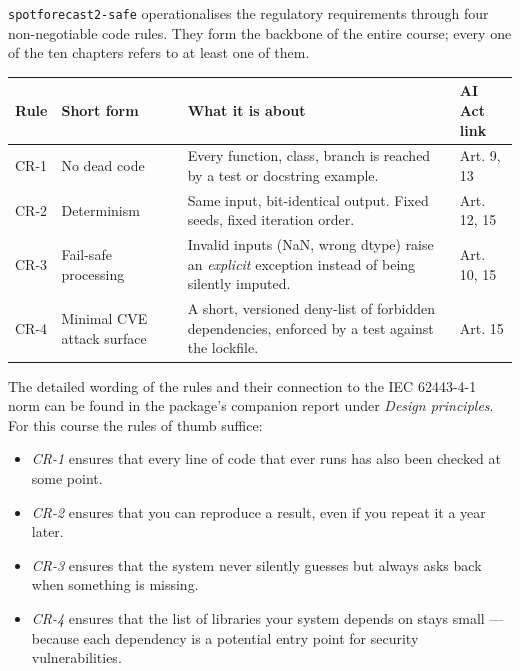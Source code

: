 \documentclass[
  english,
  letterpaper,
]{scrbook}
\newcounter{none} %
\providecommand{\tightlist}{%
  \setlength{\itemsep}{0pt}\setlength{\parskip}{0pt}}
\begin{document}

\texttt{spotforecast2-safe} operationalises the regulatory requirements
through four non-negotiable code rules. They form the backbone of the
entire course; every one of the ten chapters refers to at least one of
them.

{\def\LTcaptype{none} %
\begin{longtable}[]{@{}
  >{\centering\arraybackslash}p{}
  >{\raggedright\arraybackslash}p{}
  >{\raggedright\arraybackslash}p{}
  >{\raggedright\arraybackslash}p{}@{}}
\toprule\noalign{}
\begin{minipage}[b]{\linewidth}\centering
Rule
\end{minipage} & \begin{minipage}[b]{\linewidth}\raggedright
Short form
\end{minipage} & \begin{minipage}[b]{\linewidth}\raggedright
What it is about
\end{minipage} & \begin{minipage}[b]{\linewidth}\raggedright
AI Act link
\end{minipage} \\
\midrule\noalign{}
\endhead
\bottomrule\noalign{}
\endlastfoot
CR-1 & No dead code & Every function, class, branch is reached by a test
or docstring example. & Art. 9, 13 \\
CR-2 & Determinism & Same input, bit-identical output. Fixed seeds,
fixed iteration order. & Art. 12, 15 \\
CR-3 & Fail-safe processing & Invalid inputs (NaN, wrong dtype) raise an
\emph{explicit} exception instead of being silently imputed. & Art. 10,
15 \\
CR-4 & Minimal CVE attack surface & A short, versioned deny-list of
forbidden dependencies, enforced by a test against the lockfile. & Art.
15 \\
\end{longtable}
}

The detailed wording of the rules and their connection to the IEC
62443-4-1 norm can be found in the package's companion report under
\emph{Design principles}. For this course the rules of thumb suffice:

\begin{itemize}
\tightlist
\item
  \emph{CR-1} ensures that every line of code that ever runs has also
  been checked at some point.
\item
  \emph{CR-2} ensures that you can reproduce a result, even if you
  repeat it a year later.
\item
  \emph{CR-3} ensures that the system never silently guesses but always
  asks back when something is missing.
\item
  \emph{CR-4} ensures that the list of libraries your system depends on
  stays small --- because each dependency is a potential entry point for
  security vulnerabilities.
\end{itemize}
\end{document}
